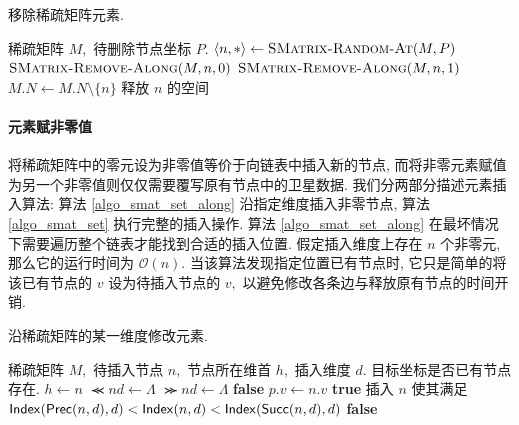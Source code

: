 \begin{breakablealgorithm}
\caption{移除稀疏矩阵元素.}
\label{algo_smat_remove}
\begin{algorithmic}[1]
\Require 稀疏矩阵 $M,$ 待删除节点坐标 $P.$
    \State $\left\langle n, *\right\rangle \gets \textsc{SMatrix-Random-At}(M, P)$
    \State $\textsc{SMatrix-Remove-Along}(M, n, 0)$
    \State $\textsc{SMatrix-Remove-Along}(M, n, 1)$
    \State $M.N \gets M.N \setminus \{n\}$
    \State 释放 $n$ 的空间
\EndProcedure
\end{algorithmic}
\end{breakablealgorithm}

\paragraph{元素赋非零值} 将稀疏矩阵中的零元设为非零值等价于向链表中插入新的节点, 而将非零元素赋值为另一个非零值则仅仅需要覆写原有节点中的卫星数据. 我们分两部分描述元素插入算法: 算法 \ref{algo_smat_set_along} 沿指定维度插入非零节点, 算法 \ref{algo_smat_set} 执行完整的插入操作. 算法 \ref{algo_smat_set_along} 在最坏情况下需要遍历整个链表才能找到合适的插入位置. 假定插入维度上存在 $n$ 个非零元, 那么它的运行时间为 $\mathcal{O}(n).$ 当该算法发现指定位置已有节点时, 它只是简单的将该已有节点的 $v$ 设为待插入节点的 $v,$ 以避免修改各条边与释放原有节点的时间开销.
\begin{breakablealgorithm}
\caption{沿稀疏矩阵的某一维度修改元素.}
\label{algo_smat_set_along}
\begin{algorithmic}[1]
\Require 稀疏矩阵 $M,$ 待插入节点 $n,$ 节点所在维首 $h,$ 插入维度 $d.$
\Ensure 目标坐标是否已有节点存在.
        \State $h \gets n$
        \State $\Prec{n}{d} \gets \Lambda$
        \State $\Succ{n}{d} \gets \Lambda$
        \State \Return \textbf{false}
    \EndIf
        \State $p.v \gets n.v$
        \State \Return \textbf{true}
    \EndIf
    \State 插入 $n$ 使其满足 $\mathsf{Index}(\mathsf{Prec}(n, d), d) < \mathsf{Index}(n, d) < \mathsf{Index}(\mathsf{Succ}(n, d), d)$
    \State \Return \textbf{false}
\EndFunction
\end{algorithmic}
\end{breakablealgorithm}

